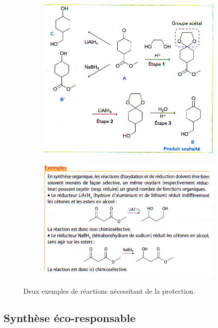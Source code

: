 \documentclass[11pt,a4paper]{article}
\begin{document}
\begin{figure}[ht]
\centering
\begin{subfigure}{.48\textwidth}
  \centering
  \includegraphics[width=.95\linewidth]{imgs/c5/protect.jpg}  
\end{subfigure}
\begin{subfigure}{.48\textwidth}
  \centering
  \includegraphics[width=.95\linewidth]{imgs/c5/protect2.jpg}  
\end{subfigure}
\caption{Deux exemples de réactions nécessitant de la protection.}
\end{figure}

\subsection{Synthèse éco-responsable}
\end{document}
